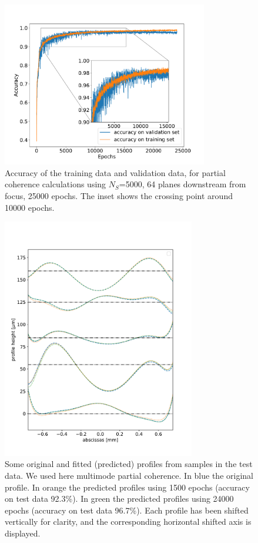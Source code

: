 \documentclass[preprint]{iucr}
\newcommand{\inred}[1]{{\color{red}#1}}
\begin{document}
 
\begin{figure}\label{fig:multimode_accuracy}
    \includegraphics[width=0.8\textwidth]{figures/figure5.pdf}
    \caption{Accuracy of the training data and validation data, for partial coherence calculations \inred{using} $N_S$=5000, 64 planes downstream from focus, 25000 epochs. \inred{The inset shows} the crossing point around 10000 epochs.
    }
\end{figure}

\begin{figure}\label{fig:multimode}
\includegraphics[width=0.75\textwidth]{figures/figure6.pdf}
\caption{
Some original and fitted (predicted) profiles from samples in the test data. We used here multimode partial coherence. \inred{In blue the original profile. In orange the predicted profiles using 1500 epochs (accuracy on test data 92.3\%). In green the predicted profiles using 24000 epochs (accuracy on test data 96.7\%). Each profile has been shifted vertically for clarity, and the corresponding horizontal shifted axis is displayed.
    }}
\end{figure}
\end{document}
